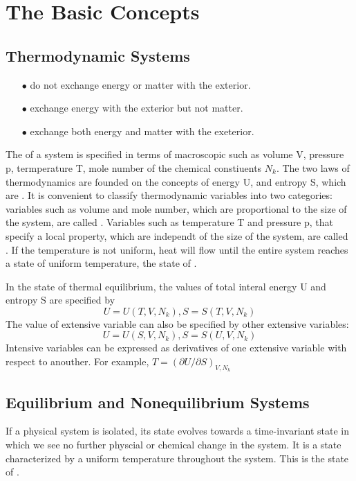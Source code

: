 \chapter{The Basic Concepts}
\section{Thermodynamic Systems}

\begin{enumerate}
\item[$\bullet$]  do not exchange energy or matter with the exterior.
\item[$\bullet$]  exchange energy with the exterior but not matter.
\item[$\bullet$]  exchange both energy and matter with the exeterior.
\end{enumerate}

The  of a system is specified in terms of macroscopic  such as volume V, pressure p, termperature T,
mole number of the chemical constiuents $N_k$. The two laws of thermodynamics are founded on the concepts of energy U, and entropy
S, which are . It is convenient to classify thermodynamic variables into two categories: variables
such as volume and mole number, which are proportional to the size of the system, are called . Variables
such as temperature T and pressure p, that specify a local property, which are independt of the size of the system, are called . If the temperature is not uniform, heat will flow until the entire system reaches a state of uniform 
temperature, the state of .

In the state of thermal equilibrium, the values of total interal energy U and entropy S are specified by 
\begin{equation}
U=U(T,V,N_k), S=S(T,V,N_k)
\end{equation}
The value of extensive variable can also be specified by other extensive variables:
\begin{equation}
U=U(S,V,N_k), S=S(U,V,N_k)
\end{equation}
Intensive variables can be expressed as derivatives of one extensive variable with respect to anouther. For example, $T=\left(
\partial U/\partial S\right)_{V,N_k}$

\section{Equilibrium and Nonequilibrium Systems}
If a physical system is isolated, its state evolves  towards a time-invariant state in which we see no further
physcial or chemical change in the system. It is a state characterized by a uniform temperature throughout the system. This is the
state of .

